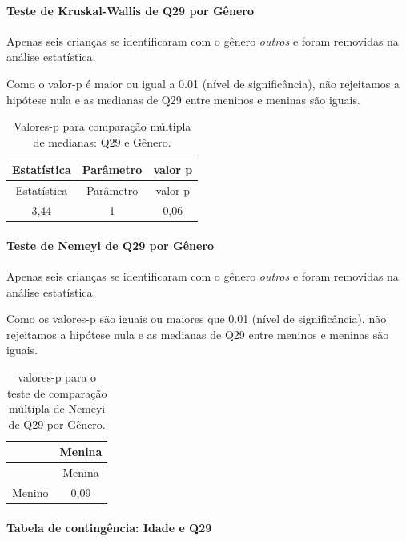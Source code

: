 \documentclass[]{article}
\let\oldparagraph\paragraph
\renewcommand{\paragraph}[1]{\oldparagraph{#1}\mbox{}}
\begin{document}
\hypertarget{teste-de-kruskal-wallis-de-q29-por-guxeanero}{%
\paragraph{Teste de Kruskal-Wallis de Q29 por Gênero}\label{teste-de-kruskal-wallis-de-q29-por-guxeanero}}

Apenas seis crianças se identificaram com o gênero \emph{outros} e foram removidas na análise estatística.

Como o valor-p é maior ou igual a 0.01 (nível de significância), não rejeitamos a hipótese nula e as medianas de Q29 entre meninos e meninas são iguais.

\begin{longtable}[]{@{}ccc@{}}
\caption{\label{tab:unnamed-chunk-915}Valores-p para comparação múltipla de medianas: Q29 e Gênero.}\tabularnewline
\toprule
Estatística & Parâmetro & valor p\tabularnewline
\midrule
\endfirsthead
\toprule
Estatística & Parâmetro & valor p\tabularnewline
\midrule
\endhead
3,44 & 1 & 0,06\tabularnewline
\bottomrule
\end{longtable}

\hypertarget{teste-de-nemeyi-de-q29-por-guxeanero}{%
\paragraph{Teste de Nemeyi de Q29 por Gênero}\label{teste-de-nemeyi-de-q29-por-guxeanero}}

Apenas seis crianças se identificaram com o gênero \emph{outros} e foram removidas na análise estatística.

Como os valores-p são iguais ou maiores que 0.01 (nível de significância), não rejeitamos a hipótese nula e as medianas de Q29 entre meninos e meninas são iguais.

\begin{longtable}[]{@{}lc@{}}
\caption{\label{tab:unnamed-chunk-917}valores-p para o teste de comparação múltipla de Nemeyi de Q29 por Gênero.}\tabularnewline
\toprule
& Menina\tabularnewline
\midrule
\endfirsthead
\toprule
& Menina\tabularnewline
\midrule
\endhead
Menino & 0,09\tabularnewline
\bottomrule
\end{longtable}

\cleardoublepage

\hypertarget{tabela-de-continguxeancia-idade-e-q29}{%
\paragraph{Tabela de contingência: Idade e Q29}\label{tabela-de-continguxeancia-idade-e-q29}}
\end{document}
